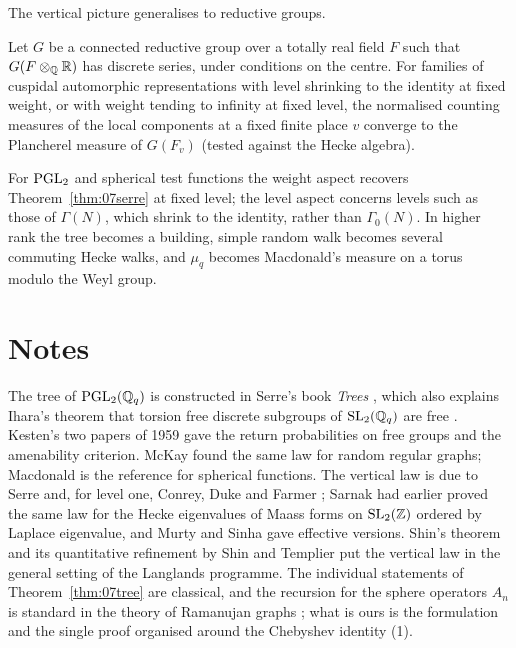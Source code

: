 The vertical picture generalises to reductive groups.

\begin{theorem}
Let $G$ be a connected reductive group over a totally real field $F$ such that $G(F\otimes_{\mathbb{Q}}\mathbb{R})$ has discrete series, under conditions on the centre. For families of cuspidal automorphic representations with level shrinking to the identity at fixed weight, or with weight tending to infinity at fixed level, the normalised counting measures of the local components at a fixed finite place $v$ converge to the Plancherel measure of $G(F_v)$ (tested against the Hecke algebra).
\end{theorem}

For $\mathrm{PGL}_2$ and spherical test functions the weight aspect recovers Theorem~\ref{thm:07serre} at fixed level; the level aspect concerns levels such as those of $\Gamma(N)$, which shrink to the identity, rather than $\Gamma_0(N)$. In higher rank the tree becomes a building, simple random walk becomes several commuting Hecke walks, and $\mu_q$ becomes Macdonald's measure on a torus modulo the Weyl group.

\section{Notes}

The tree of $\mathrm{PGL}_2(\mathbb{Q}_q)$ is constructed in Serre's book \emph{Trees} \cite{serre1980}, which also explains Ihara's theorem that torsion free discrete subgroups of $\mathrm{SL}_2(\mathbb{Q}_q)$ are free \cite{ihara1966}. Kesten's two papers of 1959 \cite{kesten1959,kesten1959b} gave the return probabilities on free groups and the amenability criterion. McKay \cite{mckay1981} found the same law for random regular graphs; Macdonald \cite{macdonald1971} is the reference for spherical functions. The vertical law is due to Serre \cite{serre1997} and, for level one, Conrey, Duke and Farmer \cite{cdf1997}; Sarnak \cite{sarnak1987} had earlier proved the same law for the Hecke eigenvalues of Maass forms on $\mathrm{SL}_2(\mathbb{Z})$ ordered by Laplace eigenvalue, and Murty and Sinha \cite{murtysinha2009} gave effective versions. Shin's theorem \cite{shin2012} and its quantitative refinement by Shin and Templier \cite{shintemplier2016} put the vertical law in the general setting of the Langlands programme. The individual statements of Theorem~\ref{thm:07tree} are classical, and the recursion for the sphere operators $A_n$ is standard in the theory of Ramanujan graphs \cite{lps1988}; what is ours is the formulation and the single proof organised around the Chebyshev identity (1).

